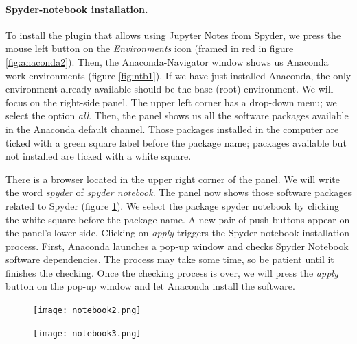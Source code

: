 \begin{paracol}{2}
 \paragraph{Spyder-notebook installation.} To install the plugin that allows using Jupyter Notes from Spyder, we press the mouse left button on the \emph{Environments} icon (framed in red in figure \ref{fig:anaconda2}). Then, the Anaconda-Navigator window shows us Anaconda work environments (figure \ref{fig:ntb1}). If we have just installed Anaconda, the only environment already available should be the base (root) environment. We will focus on the right-side panel. The upper left corner has a drop-down menu; we select the option \emph{all}. Then, the panel shows us all the software packages available in the Anaconda default channel. Those packages installed in the computer are ticked with a green square label before the package name; packages available but not installed are ticked with a white square.

 There is a browser located in the upper right corner of the panel. We will write the word \emph{spyder} of \emph{spyder notebook}. The panel now shows those software packages related to Spyder (figure \ref{fig:ntb2}). We select the package spyder notebook by clicking the white square before the package name. A new pair of push buttons appear on the panel's lower side. Clicking on \emph{apply} triggers the Spyder notebook installation process. First, Anaconda launches a pop-up window and checks Spyder Notebook software dependencies. The process may take some time, so be patient until it finishes the checking.  Once the checking process is over, we will press the \emph{apply} button on the pop-up window and let Anaconda install the software.
 
\end{paracol}
 
\begin{figure}
\centering
    \texttt{[image: notebook2.png]}
    \label{fig:ntb2}

\end{figure}

\begin{figure}
\centering
    \texttt{[image: notebook3.png]}
    \label{fig:ntb3}
\end{figure} 

